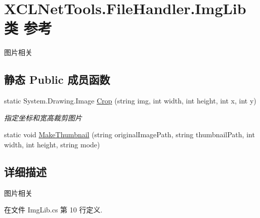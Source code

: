 \hypertarget{class_x_c_l_net_tools_1_1_file_handler_1_1_img_lib}{\section{X\-C\-L\-Net\-Tools.\-File\-Handler.\-Img\-Lib类 参考}
\label{class_x_c_l_net_tools_1_1_file_handler_1_1_img_lib}
}


图片相关  


\subsection*{静态 Public 成员函数}
\begin{DoxyCompactItemize}
\item 
static System.\-Drawing.\-Image \hyperlink{class_x_c_l_net_tools_1_1_file_handler_1_1_img_lib_ad00cc641f4f1585d61ce6c86962a6213}{Crop} (string img, int width, int height, int x, int y)
\begin{DoxyCompactList}\small\item\em 指定坐标和宽高裁剪图片 \end{DoxyCompactList}\item 
static void \hyperlink{class_x_c_l_net_tools_1_1_file_handler_1_1_img_lib_ac534eab24f71c848fb532ce77af53edc}{Make\-Thumbnail} (string original\-Image\-Path, string thumbnail\-Path, int width, int height, string mode)
\end{DoxyCompactItemize}


\subsection{详细描述}
图片相关 



在文件 Img\-Lib.\-cs 第 10 行定义.



